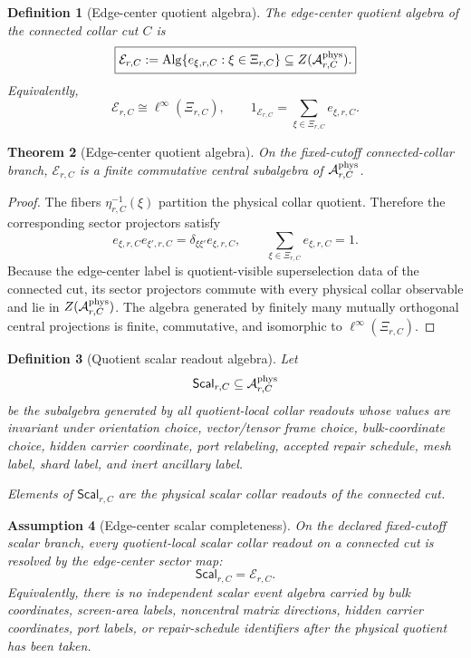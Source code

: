 \documentclass[11pt]{article}
\newtheorem{theorem}{Theorem}[section]
\newtheorem{definition}[theorem]{Definition}
\newtheorem{assumption}[theorem]{Assumption}
\theoremstyle{remark}
\theoremstyle{plain}
\begin{document}
\begin{definition}[Edge-center quotient algebra]
\label{def:edge-center-quotient-algebra}
The edge-center quotient algebra of the connected collar cut \(C\) is
\[
\boxed{
\mathcal E_{r,C}
:=
\operatorname{Alg}\{e_{\xi,r,C}:\xi\in\Xi_{r,C}\}
\subseteq
Z(\mathcal A^{\rm phys}_{r,C}).
}
\]
Equivalently,
\[
\mathcal E_{r,C}\cong \ell^\infty(\Xi_{r,C}),
\qquad
1_{\mathcal E_{r,C}}=\sum_{\xi\in\Xi_{r,C}}e_{\xi,r,C}.
\]
\end{definition}

\begin{theorem}[Edge-center quotient algebra]
\label{thm:edge-center-quotient-algebra}
On the fixed-cutoff connected-collar branch, \(\mathcal E_{r,C}\) is a finite
commutative central subalgebra of \(\mathcal A^{\rm phys}_{r,C}\).
\end{theorem}

\begin{proof}
The fibers \(\eta_{r,C}^{-1}(\xi)\) partition the physical collar quotient.
Therefore the corresponding sector projectors satisfy
\[
e_{\xi,r,C}e_{\xi',r,C}
=
\delta_{\xi\xi'}e_{\xi,r,C},
\qquad
\sum_{\xi\in\Xi_{r,C}}e_{\xi,r,C}=1.
\]
Because the edge-center label is quotient-visible superselection data of the
connected cut, its sector projectors commute with every physical collar
observable and lie in \(Z(\mathcal A^{\rm phys}_{r,C})\). The algebra generated
by finitely many mutually orthogonal central projections is finite,
commutative, and isomorphic to \(\ell^\infty(\Xi_{r,C})\).
\end{proof}

\begin{definition}[Quotient scalar readout algebra]
\label{def:quotient-scalar-readout-algebra}
Let
\[
\mathsf{Scal}_{r,C}
\subseteq
\mathcal A^{\rm phys}_{r,C}
\]
be the subalgebra generated by all quotient-local collar readouts whose values
are invariant under orientation choice, vector/tensor frame choice,
bulk-coordinate choice, hidden carrier coordinate, port relabeling, accepted
repair schedule, mesh label, shard label, and inert ancillary label.

Elements of \(\mathsf{Scal}_{r,C}\) are the physical scalar collar readouts of
the connected cut.
\end{definition}

\begin{assumption}[Edge-center scalar completeness]
\label{ass:edge-center-scalar-completeness}
On the declared fixed-cutoff scalar branch, every quotient-local scalar collar
readout on a connected cut is resolved by the edge-center sector map:
\[
\boxed{
\mathsf{Scal}_{r,C}=\mathcal E_{r,C}.
}
\]
Equivalently, there is no independent scalar event algebra carried by bulk
coordinates, screen-area labels, noncentral matrix directions, hidden carrier
coordinates, port labels, or repair-schedule identifiers after the physical
quotient has been taken.
\end{assumption}
\end{document}
